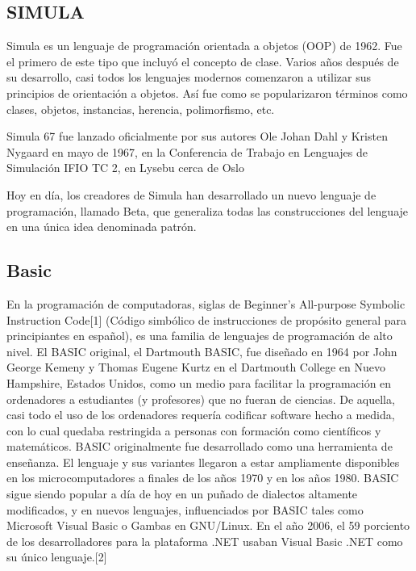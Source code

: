 \documentclass[twoside,twocolumn]{article}
\begin{document}
\subsection{SIMULA}

Simula es un lenguaje de programación orientada a objetos (OOP) de 1962. Fue el primero de este tipo que incluyó el concepto de clase. Varios años después de su desarrollo, casi todos los lenguajes modernos comenzaron a utilizar sus principios de orientación a objetos. Así fue como se popularizaron términos como clases, objetos, instancias, herencia, polimorfismo, etc.

Simula 67 fue lanzado oficialmente por sus autores Ole Johan Dahl y Kristen Nygaard en mayo de 1967, en la Conferencia de Trabajo en Lenguajes de Simulación IFIO TC 2, en Lysebu cerca de Oslo

Hoy en día, los creadores de Simula han desarrollado un nuevo lenguaje de programación, llamado Beta, que generaliza todas las construcciones del lenguaje en una única idea denominada patrón.

\subsection{Basic}

En la programación de computadoras, siglas de Beginner's All-purpose Symbolic Instruction Code[1] (Código simbólico de instrucciones de propósito general para principiantes en español), es una familia de lenguajes de programación de alto nivel. El BASIC original, el Dartmouth BASIC, fue diseñado en 1964 por John George Kemeny y Thomas Eugene Kurtz en el Dartmouth College en Nuevo Hampshire, Estados Unidos, como un medio para facilitar la programación en ordenadores a estudiantes (y profesores) que no fueran de ciencias. De aquella, casi todo el uso de los ordenadores requería codificar software hecho a medida, con lo cual quedaba restringida a personas con formación como científicos y matemáticos. BASIC originalmente fue desarrollado como una herramienta de enseñanza. El lenguaje y sus variantes llegaron a estar ampliamente disponibles en los microcomputadores a finales de los años 1970 y en los años 1980. BASIC sigue siendo popular a día de hoy en un puñado de dialectos altamente modificados, y en nuevos lenguajes, influenciados por BASIC tales como Microsoft Visual Basic o Gambas en GNU/Linux. En el año 2006, el 59 porciento de los desarrolladores para la plataforma .NET usaban Visual Basic .NET como su único lenguaje.[2]
\end{document}

